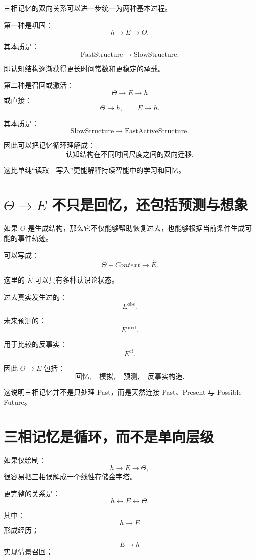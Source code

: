 三相记忆的双向关系可以进一步统一为两种基本过程。

第一种是巩固：
\[
h\rightarrow E\rightarrow\Theta.
\]

其本质是：
\[
\boxed{
\text{FastStructure}
\rightarrow
\text{SlowStructure}.
}
\]

即认知结构逐渐获得更长时间常数和更稳定的承载。

第二种是召回或激活：
\[
\Theta\rightarrow E\rightarrow h
\]
或直接：
\[
\Theta\rightarrow h,
\qquad
E\rightarrow h.
\]

其本质是：
\[
\boxed{
\text{SlowStructure}
\rightarrow
\text{FastActiveStructure}.
}
\]

因此可以把记忆循环理解成：
\[
\boxed{
\text{认知结构在不同时间尺度之间的双向迁移}.
}
\]

这比单纯“读取—写入”更能解释持续智能中的学习和回忆。

\section{$\Theta\rightarrow E$ 不只是回忆，还包括预测与想象}

如果 $\Theta$ 是生成结构，那么它不仅能够帮助恢复过去，也能够根据当前条件生成可能的事件轨迹。

可以写成：
\[
\boxed{
\Theta
+
Context
\rightarrow
\hat E.
}
\]

这里的 $\hat E$ 可以具有多种认识论状态。

过去真实发生过的：
\[
E^{\mathrm{obs}}.
\]

未来预测的：
\[
E^{\mathrm{pred}}.
\]

用于比较的反事实：
\[
E^{\mathrm{cf}}.
\]

因此 $\Theta\rightarrow E$ 包括：
\[
\text{回忆},
\quad
\text{模拟},
\quad
\text{预测},
\quad
\text{反事实构造}.
\]

这说明三相记忆并不是只处理 Past，而是天然连接 Past、Present 与 Possible Future。

\section{三相记忆是循环，而不是单向层级}

如果仅绘制：
\[
h\rightarrow E\rightarrow\Theta,
\]
很容易把三相误解成一个线性存储金字塔。

更完整的关系是：
\[
\boxed{
h
\leftrightarrow
E
\leftrightarrow
\Theta.
}
\]

其中：
\[
h\rightarrow E
\]
形成经历；

\[
E\rightarrow h
\]
实现情景召回；

